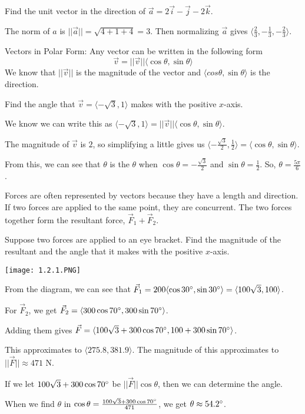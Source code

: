 \documentclass[../calc3.tex]{subfiles}
\begin{document}
\begin{example}
    Find the unit vector in the direction of $\vec{a}=2\vec{i}-\vec{j}-2\vec{k}$.

    The norm of $a$ is $||\vec{a}|| = \sqrt{4+1+4}=3$. Then normalizing $\vec{a}$ gives $\langle \frac{2}{3},-\frac{1}{3},-\frac{2}{3}\rangle$.
\end{example}

Vectors in Polar Form: Any vector can be written in the following form 
\[ \vec{v}=||\vec{v}||\langle \cos\theta, \sin\theta \rangle \]
We know that $||\vec{v}||$ is the magnitude of the vector and $\langle cos\theta, \sin\theta\rangle$ is the direction.

\begin{example}
    Find the angle that $\vec{v}=\langle -\sqrt{3},1\rangle$ makes with the positive $x$-axis.

    We know we can write this as $\langle -\sqrt{3},1\rangle=||\vec{v}||\langle \cos\theta,\sin\theta\rangle$.

    The magnitude of $\vec{v}$ is $2$, so simplifying a little gives us $\langle -\frac{\sqrt{3}}{2},\frac{1}{2}\rangle=\langle \cos\theta,\sin\theta\rangle$.

     From this, we can see that $\theta$ is the $\theta$ when $\cos\theta = -\frac{\sqrt{3}}{2}$ and $\sin\theta = \frac{1}{2}$. So, $\theta=\frac{5\pi}{6}$.
\end{example}

Forces are often represented by vectors because they have a length and direction. If two forces are applied to the same point, they are concurrent. The two forces together form the resultant force, $\vec{F}_1+\vec{F}_2$.

\begin{example}
    Suppose two forces are applied to an eye bracket. Find the magnitude of the resultant and the angle that it makes with the positive $x$-axis.
    \begin{center}
        \texttt{[image: 1.2.1.PNG]}
    \end{center}

    From the diagram, we can see that $\vec{F}_1=200\langle \cos 30\degree, \sin 30\degree\rangle = \langle 100\sqrt{3}, 100\rangle$.

    For $\vec{F}_2$, we get $\vec{F}_2=\langle 300\cos 70\degree, 300\sin 70\degree\rangle$.

    Adding them gives $\vec{F}=\langle 100\sqrt{3}+300\cos 70\degree, 100+300\sin 70\degree\rangle$.

    This approximates to $\langle 275.8,381.9\rangle$. The magnitude of this approximates to $||\vec{F}||\approx 471$ N.

    If we let $100\sqrt{3}+300\cos 70\degree$ be $||\vec{F}||\cos\theta$, then we can determine the angle. 

    When we find $\theta$ in $\cos\theta = \frac{100\sqrt{3}+300\cos 70\degree}{471}$, we get $\theta \approx 54.2\degree$.
\end{example}
\end{document}
